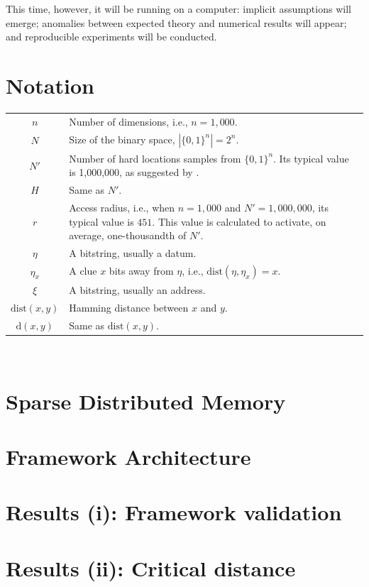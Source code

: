 This time, however, it will be running on a computer:  implicit assumptions will emerge; anomalies between expected theory and numerical results will appear; and reproducible experiments will be conducted.

\chapter{Notation}

\begin{tabular}{cp{\textwidth}}
  $n$ & Number of dimensions, i.e., $n=1,000$. \\
  $N$ & Size of the binary space, $|\{0, 1\}^n| = 2^n$. \\
  $N'$ & Number of hard locations samples from $\{0, 1\}^n$. Its typical value is 1,000,000, as suggested by \citet{Kanerva1988}. \\
  $H$ & Same as $N'$. \\
  $r$ & Access radius, i.e., when $n=1,000$ and $N'=1,000,000$, its typical value is $451$. This value is calculated to activate, on average, one-thousandth of $N'$. \\
  $\eta$ & A bitstring, usually a datum. \\
  $\eta_x$ & A clue $x$ bits away from $\eta$, i.e., $\text{dist}(\eta, \eta_x) = x$. \\
  $\xi$ & A bitstring, usually an address. \\
  $\text{dist}(x, y)$ & Hamming distance between $x$ and $y$. \\
  $\text{d}(x, y)$ & Same as $\text{dist}(x, y)$.
\end{tabular}\\

\chapter{Sparse Distributed Memory}



\chapter{Framework Architecture}



\chapter{Results (i): Framework validation}



\chapter{Results (ii): Critical distance}



